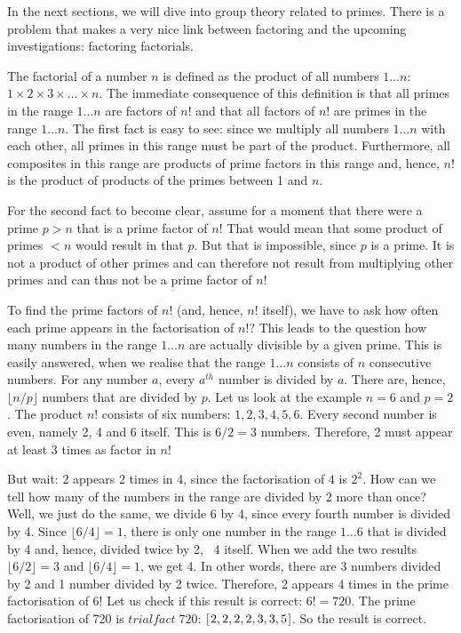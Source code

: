 \documentclass{scrreprt}
\newcommand{\Varid}[1]{\mathit{#1}}
\begin{document}
In the next sections, 
we will dive into group theory
related to primes.
There is a problem
that makes a very nice link
between factoring and the upcoming investigations:
factoring factorials.

The factorial of a number $n$
is defined as the product
of all numbers $1\dots n$:
$1 \times 2 \times 3 \times \dots \times n$.
The immediate consequence of this definition
is that all primes in the range $1\dots n$
are factors of $n!$ and that all factors
of $n!$ are primes in the range $1\dots n$.
The first fact is easy to see:
since we multiply all numbers $1\dots n$
with each other, all primes in this range
must be part of the product.
Furthermore, all composites in this range
are products of prime factors in this range
and, hence, $n!$ is the product of products
of the primes between 1 and $n$.

For the second fact to become clear,
assume for a moment that there were
a prime $p > n$ that is a prime factor of $n!$
That would mean that some product 
of primes $< n$ would result in that $p$.
But that is impossible, since $p$ is a prime.
It is not a product of other primes and can
therefore not result from multiplying
other primes and can thus
not be a prime factor of $n!$

To find the prime factors
of $n!$ (and, hence, $n!$ itself), we have to ask 
how often each prime appears in the factorisation of $n!$?
This leads to the question
how many numbers in the range $1\dots n$ are actually
divisible by a given prime.
This is easily answered, when we realise that the range
$1\dots n$ consists of $n$ consecutive numbers.
For any number $a$, every $a^{th}$ number is divided by $a$.
There are, hence, $\lfloor n/p\rfloor$ numbers that are
divided by $p$.
Let us look at the example $n=6$ and $p=2$.
The product $n!$ consists of six numbers:
$1,2,3,4,5,6$. Every second number is even,
namely 2, 4 and 6 itself.
This is $6/2 = 3$ numbers.
Therefore, 2 must appear at least 3 times as factor
in $n!$

But wait: 2 appears 2 times in 4, since the factorisation
of 4 is $2^2$.
How can we tell how many of the numbers in the range
are divided by 2 more than once?
Well, we just do the same, we divide 6 by 4,
since every fourth number is divided by 4.
Since $\lfloor 6/4\rfloor = 1$, there is only one number
in the range $1\dots 6$ that is divided by 4 and,
hence, divided twice by 2, \viz\ 4 itself.
When we add the two results 
$\lfloor 6/2\rfloor = 3$ and
$\lfloor 6/4\rfloor = 1$,
we get 4. In other words,
there are 3 numbers divided by 2 and 1 number
divided by 2 twice. Therefore, 2 appears 4 times
in the prime factorisation of $6!$
Let us check if this result is correct:
$6! = 720$. The prime factorisation of 720 is
\ensuremath{\Varid{trialfact}\;\mathrm{720}}: \ensuremath{[\mskip1.5mu \mathrm{2},\mathrm{2},\mathrm{2},\mathrm{2},\mathrm{3},\mathrm{3},\mathrm{5}\mskip1.5mu]}.
So the result is correct.
\end{document}

